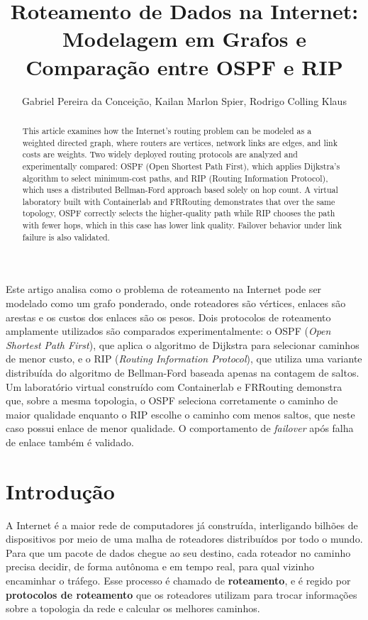 \documentclass[12pt]{article}
\title{Roteamento de Dados na Internet: Modelagem em Grafos e Comparação entre OSPF e RIP}
\author{Gabriel Pereira da Conceição\inst{1}, Kailan Marlon Spier\inst{2}, Rodrigo Colling Klaus\inst{3}}
\begin{document}
\maketitle

\begin{abstract}
  This article examines how the Internet's routing problem can be modeled as a
  weighted directed graph, where routers are vertices, network links are edges,
  and link costs are weights. Two widely deployed routing protocols are analyzed
  and experimentally compared: OSPF (Open Shortest Path First), which applies
  Dijkstra's algorithm to select minimum-cost paths, and RIP (Routing Information
  Protocol), which uses a distributed Bellman-Ford approach based solely on hop
  count. A virtual laboratory built with Containerlab and FRRouting demonstrates
  that over the same topology, OSPF correctly selects the higher-quality path while
  RIP chooses the path with fewer hops, which in this case has lower link quality.
  Failover behavior under link failure is also validated.
\end{abstract}

\begin{resumo}
  Este artigo analisa como o problema de roteamento na Internet pode ser modelado
  como um grafo ponderado, onde roteadores são vértices, enlaces são arestas e os
  custos dos enlaces são os pesos. Dois protocolos de roteamento amplamente
  utilizados são comparados experimentalmente: o OSPF (\textit{Open Shortest Path
  First}), que aplica o algoritmo de Dijkstra para selecionar caminhos de menor
  custo, e o RIP (\textit{Routing Information Protocol}), que utiliza uma variante
  distribuída do algoritmo de Bellman-Ford baseada apenas na contagem de saltos.
  Um laboratório virtual construído com Containerlab e FRRouting demonstra que,
  sobre a mesma topologia, o OSPF seleciona corretamente o caminho de maior
  qualidade enquanto o RIP escolhe o caminho com menos saltos, que neste caso possui
  enlace de menor qualidade. O comportamento de \textit{failover} após falha de
  enlace também é validado.
\end{resumo}

\section{Introdução}

A Internet é a maior rede de computadores já construída, interligando bilhões de
dispositivos por meio de uma malha de roteadores distribuídos por todo o mundo.
Para que um pacote de dados chegue ao seu destino, cada roteador no caminho precisa
decidir, de forma autônoma e em tempo real, para qual vizinho encaminhar o tráfego.
Esse processo é chamado de \textbf{roteamento}, e é regido por \textbf{protocolos
de roteamento} que os roteadores utilizam para trocar informações sobre a topologia
da rede e calcular os melhores caminhos.
\end{document}
